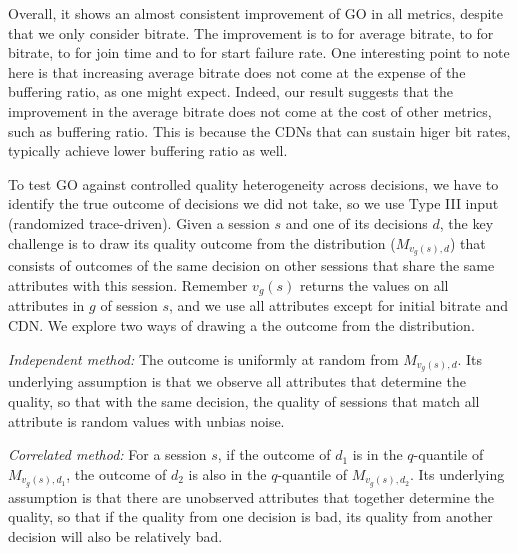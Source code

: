 Overall, it shows an almost consistent improvement of GO in all metrics, despite that we only consider bitrate. The improvement is \fillme to \fillme for average bitrate, \fillme to \fillme for bitrate, \fillme to \fillme for join time and \fillme to \fillme for start failure rate. One interesting point to note here is that increasing average bitrate does not come at the expense of the buffering ratio, as one might expect. Indeed, our result suggests that the improvement in the average bitrate does not come at the cost of other metrics, such as buffering ratio. This is because the CDNs that can sustain higer bit rates, typically achieve lower buffering ratio as well.

To test GO against controlled quality heterogeneity across decisions, we have to identify the true outcome of decisions we did not take, so we use Type III input (randomized trace-driven). Given a session $s$ and one of its decisions $d$, the key challenge is to draw its quality outcome from the distribution ($M_{v_g(s),d}$) that consists of outcomes of the same decision on other sessions that share the same attributes with this session. Remember $v_g(s)$ returns the values on all attributes in $g$ of session $s$, and we use all attributes except for initial bitrate and CDN.
We explore two ways of drawing a the outcome from the distribution. 
\begin{packedenumerate}
	\item {\it Independent method:} The outcome is uniformly at random from $M_{v_g(s),d}$. Its underlying assumption is that we observe all attributes that determine the quality, so that with the same decision, the quality of sessions that match all attribute is random values with unbias noise.
	\item {\it Correlated method:} For a session $s$, if the outcome of $d_1$ is in the $q$-quantile of $M_{v_g(s),d_1}$, the outcome of $d_2$ is also in the $q$-quantile of $M_{v_g(s),d_2}$. Its underlying assumption is that there are unobserved attributes that together determine the quality, so that if the quality from one decision is bad, its quality from another decision will also be relatively bad.
\end{packedenumerate}

